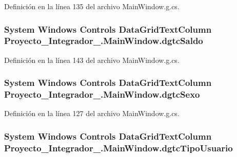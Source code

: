 Definición en la línea 135 del archivo Main\-Window.\-g.\-cs.

\hypertarget{class_proyecto___integrador__3_1_1_main_window_a4ebf6bc961d2d0fab8efaa8e3ea2879c}{
\subsubsection[{dgtc\-Saldo}]{\setlength{\rightskip}{0pt plus 5cm}System Windows Controls Data\-Grid\-Text\-Column Proyecto\-\_\-\-Integrador\-\_.\-Main\-Window.\-dgtc\-Saldo\hspace{0.3cm}{\ttfamily [package]}}}\label{class_proyecto___integrador__3_1_1_main_window_a4ebf6bc961d2d0fab8efaa8e3ea2879c}


Definición en la línea 143 del archivo Main\-Window.\-g.\-cs.

\hypertarget{class_proyecto___integrador__3_1_1_main_window_a62ea2abb05ef20cbb64ebc690ca3011d}{
\subsubsection[{dgtc\-Sexo}]{\setlength{\rightskip}{0pt plus 5cm}System Windows Controls Data\-Grid\-Text\-Column Proyecto\-\_\-\-Integrador\-\_.\-Main\-Window.\-dgtc\-Sexo\hspace{0.3cm}{\ttfamily [package]}}}\label{class_proyecto___integrador__3_1_1_main_window_a62ea2abb05ef20cbb64ebc690ca3011d}


Definición en la línea 127 del archivo Main\-Window.\-g.\-cs.

\hypertarget{class_proyecto___integrador__3_1_1_main_window_a7760fc254a46e1c3b276f91e25f17a6a}{
\subsubsection[{dgtc\-Tipo\-Usuario}]{\setlength{\rightskip}{0pt plus 5cm}System Windows Controls Data\-Grid\-Text\-Column Proyecto\-\_\-\-Integrador\-\_.\-Main\-Window.\-dgtc\-Tipo\-Usuario\hspace{0.3cm}{\ttfamily [package]}}}\label{class_proyecto___integrador__3_1_1_main_window_a7760fc254a46e1c3b276f91e25f17a6a}


